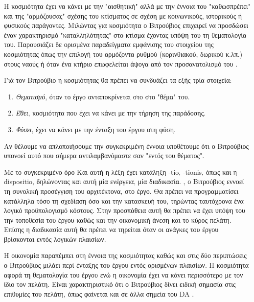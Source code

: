 \begin{description}[style=nextline]
\item[Decor]
  
Η κοσμιότητα έχει να κάνει με την "αισθητική" αλλά με την έννοια του 
"καθωσπρέπει" και της "αρμόζουσας" σχέσης του κτίσματος σε σχέση με 
κοινωνικούς, ιστορικούς ή φυσικούς παράγοντες. Μιλώντας για κοσμιότητα ο 
Βιτρούβιος επιχειρεί να προσδώσει έναν χαρακτηρισμό "καταλληλότητας" στο κτίσμα 
έχοντας υπόψη του τη θεματολογία του. Παρουσιάζει δε ορισμένα παραδείγματα 
εμφάνισης του στοιχείου της κοσμιότητας όπως την επιλογή του αρμόζοντα ρυθμού 
(κορινθιακού, δωρικού κ.λπ.) στους ναούς ή όταν ένα κτήριο επωφελείται άψογα 
από τον προσανατολισμό του \cite{scranton_vitruvius_1974}. 

Γιά τον Βιτρούβιο η κοσμιότητας θα πρέπει να συνδυάζει τα εξής τρία στοιχεία:

\begin{enumerate}[noitemsep]
  \item \emph{Θεματισμό}, όταν το έργο ανταποκρίνεται στο στο "θέμα" του.
  \item \emph{Έθει}, κοσμιότητα που έχει να κάνει με την τήρηση της παράδοσης.
  \item \emph{Φύσει}, έχει να κάνει με την ένταξη του έργου στη φύση.
\end{enumerate}

Αν θέλουμε να απλοποιήσουμε την συγκεκριμένη έννοια υποθέτουμε ότι ο Βιτρούβιος υπονοεί αυτό που σήμερα αντιλαμβανόμαστε σαν "εντός του θέματος".
  
\item[Distributio]

Με το συγκεκριμένο όρο\sidenote%
    {Και αυτή η λέξη έχει κατάληξη -tio, -tionis, όπως και η dispositio, δηλώνοντας και αυτή μία ενέργεια, μία διαδικασία.} 
, ο Βιτρούβιος εννοεί τη συνολική προσέγγιση του αρχιτέκτονα, στο έργο. Θα 
πρέπει να προγραμματίσει κατάλληλα τόσο τη σχεδίαση όσο και την κατασκευή του, 
τηρώντας ταυτόχρονα ένα λογικό προϋπολογισμό κόστους. Στην προσπάθεια αυτή θα 
πρέπει να έχει υπόψη του την τοποθεσία του έργου καθώς και την οικονομική άνεση 
και το κύρος πελάτη. Επίσης η διαδικασία αυτή θα πρέπει να τηρείται όταν οι 
ανάγκες του έργου βρίσκονται εντός λογικών πλαισίων. 

Η οικονομία παραπέμπει στη έννοια της κοσμιότητας καθώς και στις δύο 
περιπτώσεις ο Βιτρούβιος μιλάει περί ένταξης του έργου εντός ορισμένων 
πλαισίων. Η κοσμιότητα αφορά τη θεματολογία του έργου ενώ η οικονομία έχει να 
κάνει περισσότερο με τον ίδιο τον πελάτη. Είναι χαρακτηριστικό ότι ο Βιτρούβιος 
δίνει ειδική σημασία στις επιθυμίες του πελάτη, όπως φαίνεται και σε άλλα 
σημεία του DA \cite{scranton_vitruvius_1974}.

\end{description}